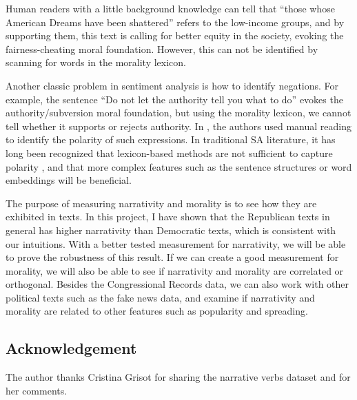 \documentclass[a4paper]{article}
\begin{document}
Human readers with a little background knowledge can tell that  ``those whose American Dreams have been shattered'' refers to the low-income groups, and by supporting them, this text is calling for better equity in the society, evoking the fairness-cheating moral foundation. However, this can not be identified by scanning for words in the morality lexicon.

Another classic problem in sentiment analysis is how to identify negations. For example, the sentence ``Do not let the authority tell you what to do'' evokes the authority/subversion moral foundation, but using the morality lexicon, we cannot tell whether it supports or rejects authority. In \cite{graham2009liberals}, the authors used manual reading to identify the polarity of such expressions. In traditional SA literature, it has long been recognized that lexicon-based methods are not sufficient to capture polarity \cite{pang2008opinion}, and that more complex features such as the sentence structures or word embeddings \cite{maas2011learning} will be beneficial.

The purpose of measuring narrativity and morality is to see how they are exhibited in texts. In this project, I have shown that the Republican texts in general has higher narrativity than Democratic texts, which is consistent with our intuitions. With a better tested measurement for narrativity, we will be able to prove the robustness of this result. If we can create a good measurement for morality, we will also be able to see if narrativity and morality are correlated or orthogonal. Besides the Congressional Records data, we can also work with other political texts such as the fake news data, and examine if narrativity and morality are related to other features such as popularity and spreading.

\subsection*{Acknowledgement}
The author thanks Cristina Grisot for sharing the narrative verbs dataset and for her comments.



\end{document}

